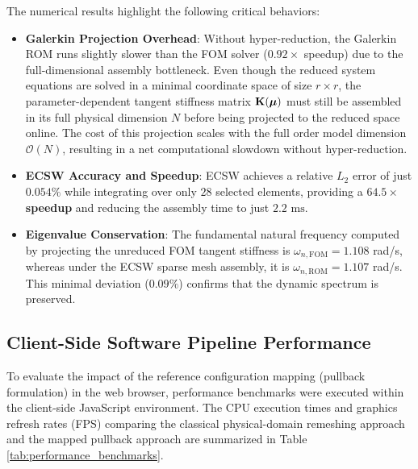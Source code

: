 The numerical results highlight the following critical behaviors:
\begin{itemize}
        \item \textbf{Galerkin Projection Overhead}: Without hyper-reduction, the Galerkin ROM runs slightly slower than the FOM solver ($0.92\times$ speedup) due to the full-dimensional assembly bottleneck. Even though the reduced system equations are solved in a minimal coordinate space of size $r \times r$, the parameter-dependent tangent stiffness matrix $\mathbf{K}(\boldsymbol{\mu})$ must still be assembled in its full physical dimension $N$ before being projected to the reduced space online. The cost of this projection scales with the full order model dimension $\mathcal{O}(N)$, resulting in a net computational slowdown without hyper-reduction.
        \item \textbf{ECSW Accuracy and Speedup}: ECSW achieves a relative $L_2$ error of just $0.054\%$ while integrating over only $28$ selected elements, providing a \textbf{$64.5\times$ speedup} and reducing the assembly time to just $2.2\text{ ms}$.
        \item \textbf{Eigenvalue Conservation}: The fundamental natural frequency computed by projecting the unreduced FOM tangent stiffness is $\omega_{n,\text{FOM}} = 1.108$ rad/s, whereas under the ECSW sparse mesh assembly, it is $\omega_{n,\text{ROM}} = 1.107$ rad/s. This minimal deviation ($0.09\%$) confirms that the dynamic spectrum is preserved.
\end{itemize}

\subsection{Client-Side Software Pipeline Performance}
To evaluate the impact of the reference configuration mapping (pullback formulation) in the web browser, performance benchmarks were executed within the client-side JavaScript environment. The CPU execution times and graphics refresh rates (FPS) comparing the classical physical-domain remeshing approach and the mapped pullback approach are summarized in Table \ref{tab:performance_benchmarks}.


